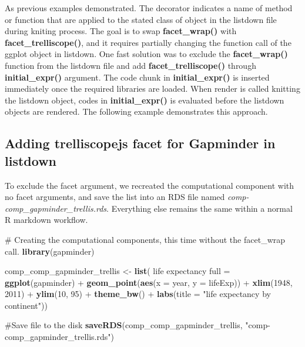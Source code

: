 \documentclass[
]{article}
\newenvironment{Shaded}{\begin{snugshade}}{\end{snugshade}}
\newcommand{\CommentTok}[1]{\textcolor[rgb]{0.54,0.53,0.53}{#1}}
\newcommand{\DataTypeTok}[1]{\textcolor[rgb]{0.00,0.34,0.68}{#1}}
\newcommand{\DecValTok}[1]{\textcolor[rgb]{0.69,0.50,0.00}{#1}}
\newcommand{\KeywordTok}[1]{\textcolor[rgb]{0.12,0.11,0.11}{\textbf{#1}}}
\newcommand{\NormalTok}[1]{\textcolor[rgb]{0.12,0.11,0.11}{#1}}
\newcommand{\OperatorTok}[1]{\textcolor[rgb]{0.12,0.11,0.11}{#1}}
\newcommand{\StringTok}[1]{\textcolor[rgb]{0.75,0.01,0.01}{#1}}
\begin{document}
As previous examples demonstrated. The decorator indicates a name of
method or function that are applied to the stated class of object in the
listdown file during kniting process. The goal is to swap
\textbf{facet\_wrap()} with \textbf{facet\_trelliscope()}, and it
requires partially changing the function call of the ggplot object in
listdown. One fast solution was to exclude the \textbf{facet\_wrap()}
function from the listdown file and add \textbf{facet\_trelliscope()}
through \textbf{initial\_expr()} argument. The code chunk in
\textbf{initial\_expr()} is inserted immediately once the required
libraries are loaded. When render is called knitting the listdown
object, codes in \textbf{initial\_expr()} is evaluated before the
listdown objects are rendered. The following example demonstrates this
approach.

\hypertarget{adding-trelliscopejs-facet-for-gapminder-in-listdown}{%
\subsection{Adding trelliscopejs facet for Gapminder in
listdown}\label{adding-trelliscopejs-facet-for-gapminder-in-listdown}}

To exclude the facet argument, we recreated the computational component
with no facet arguments, and save the list into an RDS file named
\emph{comp-comp\_gapminder\_trellis.rds}. Everything else remains the
same within a normal R markdown workflow.

\begin{Shaded}
\begin{Highlighting}[]
\CommentTok{\# Creating the computational components, this time without the \textquotesingle{}facet\_wrap\textquotesingle{} call.}
\KeywordTok{library}\NormalTok{(gapminder)}

\NormalTok{comp\_comp\_gapminder\_trellis \textless{}{-}}\StringTok{ }\KeywordTok{list}\NormalTok{(}
  \StringTok{\textasciigrave{}}\DataTypeTok{life expectancy full}\StringTok{\textasciigrave{}}\NormalTok{ =}\StringTok{ }\KeywordTok{ggplot}\NormalTok{(gapminder) }\OperatorTok{+}\StringTok{ }\KeywordTok{geom\_point}\NormalTok{(}\KeywordTok{aes}\NormalTok{(}\DataTypeTok{x =}\NormalTok{ year, }\DataTypeTok{y =}\NormalTok{ lifeExp)) }\OperatorTok{+}\StringTok{ }
\StringTok{                           }\KeywordTok{xlim}\NormalTok{(}\DecValTok{1948}\NormalTok{, }\DecValTok{2011}\NormalTok{) }\OperatorTok{+}\StringTok{ }\KeywordTok{ylim}\NormalTok{(}\DecValTok{10}\NormalTok{, }\DecValTok{95}\NormalTok{) }\OperatorTok{+}\StringTok{ }\KeywordTok{theme\_bw}\NormalTok{() }\OperatorTok{+}\StringTok{ }
\StringTok{                           }\KeywordTok{labs}\NormalTok{(}\DataTypeTok{title =} \StringTok{"life expectancy by continent"}\NormalTok{))}

\CommentTok{\#Save file to the disk}
 \KeywordTok{saveRDS}\NormalTok{(comp\_comp\_gapminder\_trellis, }\StringTok{"comp{-}comp\_gapminder\_trellis.rds"}\NormalTok{)}
\end{Highlighting}
\end{Shaded}
\end{document}
